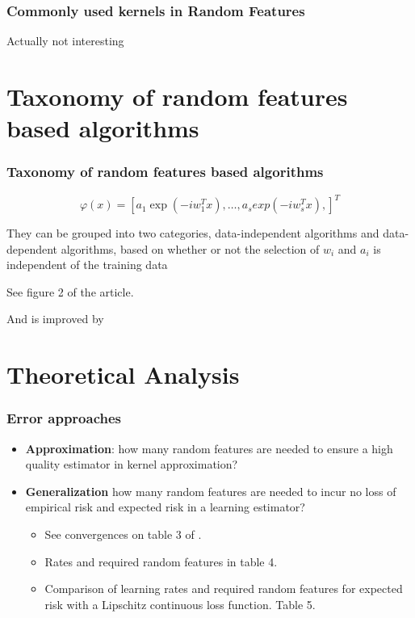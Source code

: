 \begin{frame}
  \frametitle{Commonly used kernels in Random Features}

  Actually not interesting 

\end{frame}

\section{Taxonomy of random features based algorithms}
\begin{frame}
  \frametitle{Taxonomy of random features based algorithms}

  \begin{equation}
    \varphi(x)
    = 
    \left[
     a_1 \exp{(- i w_1^T x )},
      \ldots,
     a_s exp{(-i w^T_s x)}, 
    \right]^T
  \end{equation}

They can be grouped into two categories,
data-independent algorithms and data-dependent algorithms, based
on whether or not the selection of $w_i$ and $a_i$ is independent of the
training data

See figure 2 of the article. 

And \cite{NIPS2008_0efe3284} is improved by \cite{le2014fastfood}
\end{frame}

\section{Theoretical Analysis}
\begin{frame}
  \frametitle{Error approaches }


\begin{itemize}
  \item \textbf{Approximation}: how many random features are needed to
  ensure a high quality estimator in kernel approximation?
  \item \textbf{Generalization} how many random features are needed to
  incur no loss of empirical risk and expected risk in a learning
  estimator?

  \begin{itemize}
    \item See convergences on table 3 of \cite{liu2021random}. 
    \item Rates and required random features in table 4.
    \item Comparison of learning rates and required random features for expected risk with a Lipschitz continuous loss function. Table 5. 
  \end{itemize}

\end{itemize}
  

\end{frame}


